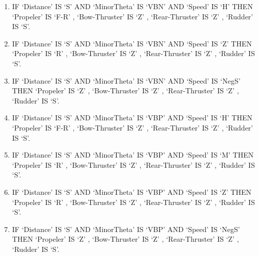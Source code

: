 \begin{enumerate}
\item	IF ‘Distance’ IS ‘S’   AND ‘MinorTheta’ IS ‘VBN’  AND ‘Speed’ IS ‘H’   THEN  ‘Propeler’ IS ‘F-R’ ,  ‘Bow-Thruster’ IS ‘Z’  ,  ‘Rear-Thruster’ IS  ‘Z’  ,  ‘Rudder’ IS ‘S’. 
\item IF ‘Distance’ IS ‘S’   AND ‘MinorTheta’ IS ‘VBN’  AND ‘Speed’ IS ‘Z’    THEN  ‘Propeler’ IS  ‘R’ ,  ‘Bow-Thruster’ IS ‘Z’  ,  ‘Rear-Thruster’ IS  ‘Z’  ,  ‘Rudder’ IS ‘S’. 
\item	IF ‘Distance’ IS ‘S’   AND ‘MinorTheta’ IS ‘VBN’  AND ‘Speed’ IS ‘NegS’   THEN  ‘Propeler’ IS ‘Z’ ,  ‘Bow-Thruster’ IS ‘Z’  ,  ‘Rear-Thruster’ IS  ‘Z’  ,  ‘Rudder’ IS ‘S’. 
\item	IF ‘Distance’ IS ‘S’   AND ‘MinorTheta’ IS ‘VBP’  AND ‘Speed’ IS ‘H’   THEN  ‘Propeler’ IS ‘F-R’ ,  ‘Bow-Thruster’ IS ‘Z’  ,  ‘Rear-Thruster’ IS  ‘Z’  ,  ‘Rudder’ IS ‘S’. 
\item	IF ‘Distance’ IS ‘S’   AND ‘MinorTheta’ IS ‘VBP’  AND ‘Speed’ IS ‘M’   THEN  ‘Propeler’ IS  ‘R’ ,  ‘Bow-Thruster’ IS ‘Z’  ,  ‘Rear-Thruster’ IS  ‘Z’  ,  ‘Rudder’ IS ‘S’. 
\item	IF ‘Distance’ IS ‘S’   AND ‘MinorTheta’ IS ‘VBP’  AND ‘Speed’ IS ‘Z’   THEN  ‘Propeler’ IS ‘R’ ,  ‘Bow-Thruster’ IS ‘Z’  ,  ‘Rear-Thruster’ IS  ‘Z’  ,  ‘Rudder’ IS ‘S’. 
\item	IF ‘Distance’ IS ‘S’   AND ‘MinorTheta’ IS ‘VBP’  AND ‘Speed’ IS ‘NegS’   THEN  ‘Propeler’ IS ‘Z’ ,  ‘Bow-Thruster’ IS ‘Z’  ,  ‘Rear-Thruster’ IS  ‘Z’  ,  ‘Rudder’ IS ‘S’. 

\end{enumerate}


